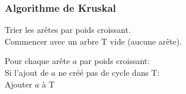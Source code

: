 \documentclass{beamer}
\begin{document}



\begin{frame}
    \frametitle{Algorithme de Kruskal}
    Trier les arêtes par poids croissant.\\
    Commencer avec un arbre T vide (aucune arête).
    \vspace{2\baselineskip}

    Pour chaque arête $a$ par poids croissant:\\
    \hspace{.5cm} Si l'ajout de $a$ ne créé pas de cycle dans T:\\
    \hspace{1cm} Ajouter $a$ à T
\end{frame}
\end{document}
